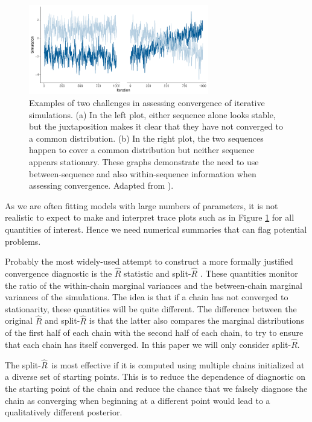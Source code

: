 \documentclass[american,]{article}
\newcommand{\sRhat}{split-$\widehat{R}$}
\theoremstyle{definition}
\begin{document}
\begin{figure}
  \center
\includegraphics[width=0.7\textwidth]{graphics/convergechallenge.pdf}
\caption{ Examples of two challenges in assessing convergence of iterative
simulations. (a) In the left plot, either sequence alone looks stable, but the
juxtaposition makes it clear that they have not converged to a common
distribution. (b) In the right plot, the two sequences happen to cover a common
distribution but neither sequence appears stationary. These graphs demonstrate
the need to use between-sequence and also within-sequence information when
assessing convergence. Adapted from \citet{BDA3}).}
\label{converge.challenge}
\end{figure}

As we are often fitting models with large
numbers of parameters, it is not realistic to expect to make and interpret
trace plots such as in Figure \ref{converge.challenge} for all
quantities of interest. Hence we need numerical summaries that can flag
potential problems. 


Probably the most widely-used attempt to construct a more formally justified 
convergence diagnostic  is the  \(\widehat{R}\) statistic
\citep{Gelman+Rubin:1992, Brooks+Gelman:1998} and
split-\(\widehat{R}\) \citep{BDA3}.  These quantities monitor the ratio of
the within-chain marginal variances and the between-chain marginal variances
of the simulations. The idea is that if a chain has not converged to 
stationarity, these quantities will be quite different.  The difference between
the original $\widehat{R}$ and split-$\widehat{R}$ is that the latter also compares 
the marginal distributions of the first half of each chain with the second
half of each chain, to try to ensure that each chain has itself converged.  In this
paper we will only consider \sRhat .

The \sRhat\ is most effective if it is computed using multiple chains initialized at a 
diverse set of starting points. This is to reduce the dependence of diagnostic
on the starting point of the chain and reduce the chance that we falsely diagnose
the chain as converging when beginning at a different point would lead to a 
qualitatively different posterior.
\end{document}
